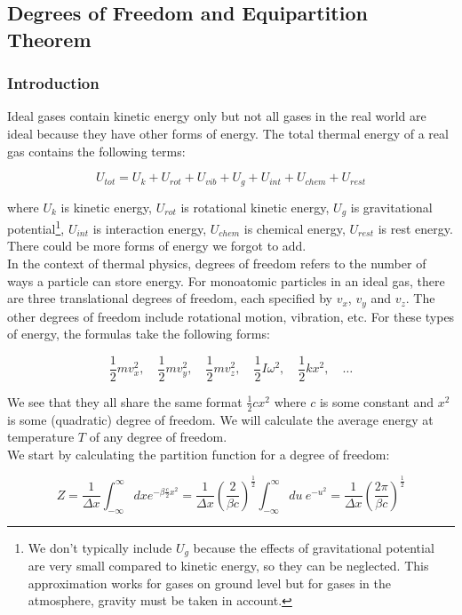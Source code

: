 \subsection{Degrees of Freedom and Equipartition Theorem}

\subsubsection{Introduction}

Ideal gases contain kinetic energy only but not all gases in the real world are ideal because they have other forms of energy. The total thermal energy of a real gas contains the following terms:

$$U_{tot}=U_k+U_{rot}+U_{vib}+U_g+U_{int}+U_{chem}+U_{rest}$$

where $U_k$ is kinetic energy, $U_{rot}$ is rotational kinetic energy, $U_g$ is gravitational potential\footnote{We don't typically include $U_g$ because the effects of gravitational potential are very small compared to kinetic energy, so they can be neglected. This approximation works for gases on ground level but for gases in the atmosphere, gravity must be taken in account.}, $U_{int}$ is interaction energy, $U_{chem}$ is chemical energy, $U_{rest}$ is rest energy. There could be more forms of energy we forgot to add. \\

In the context of thermal physics, degrees of freedom refers to the number of ways a particle can store energy. For monoatomic particles in an ideal gas, there are three translational degrees of freedom, each specified by $v_x$, $v_y$ and $v_z$. The other degrees of freedom include rotational motion, vibration, etc. For these types of energy, the formulas take the following forms:

$$\frac12mv_x^2, \quad \frac12mv_y^2, \quad \frac12mv_z^2, \quad \frac12I\omega^2, \quad \frac12kx^2, \quad \dots$$

We see that they all share the same format $\frac12cx^2$ where $c$ is some constant and $x^2$ is some (quadratic) degree of freedom. We will calculate the average energy at temperature $T$ of any degree of freedom. \\

We start by calculating the partition function for a degree of freedom:

$$Z=\frac{1}{\Delta x}\int_{-\infty}^\infty dx e^{-\beta\frac{c}{2}x^2}=\frac{1}{\Delta x}\left(\frac{2}{\beta c}\right)^\frac12 \int_{-\infty}^\infty du \: e^{-u^2}=\frac{1}{\Delta x}\left(\frac{2\pi}{\beta c}\right)^\frac12$$

